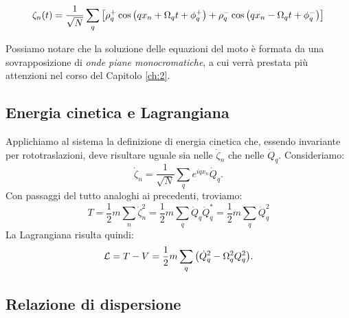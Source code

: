         \begin{equation}
            \zeta_n\qty(t)=\frac{1}{\sqrt{N}}\sum_q\qty[\rho_q^+\cos\qty(qx_n+\Omega_qt+\phi_q^+)+\rho_q^-\cos\qty(qx_n-\Omega_qt+\phi_q^-)]
        \end{equation}
        \par Possiamo notare che la soluzione delle equazioni del moto \`e formata da una sovrapposizione di \emph{onde piane monocromatiche}, a cui verr\`a prestata pi\`u attenzioni nel corso del Capitolo \ref{ch:2}.
    \subsection{Energia cinetica e Lagrangiana}
        Applichiamo al sistema la definizione di energia cinetica che, essendo invariante per rototraslazioni, deve risultare uguale sia nelle $\dot{\zeta}_n$ che nelle $\dot{Q}_q$. Consideriamo:
            $$\dot{\zeta}_n=\frac{1}{\sqrt{N}}\sum_qe^{iqx_n}\dot{Q}_q.$$
        Con passaggi del tutto analoghi ai precedenti, troviamo:
            $$T=\frac{1}{2}m\sum_n\dot{\zeta}_n^2=\frac{1}{2}m\sum_q\dot{Q}_q\dot{Q}^*_q=\frac{1}{2}m\sum_q\dot{Q}_q^2$$
        La Lagrangiana risulta quindi:
        \begin{equation}
            \mathcal{L}=T-V=\frac{1}{2}m\sum_q\qty(\dot{Q}_q^2-\Omega_q^2Q_q^2).
            \label{eq:mollelagrangiana}
        \end{equation}
    \subsection{Relazione di dispersione}
        
